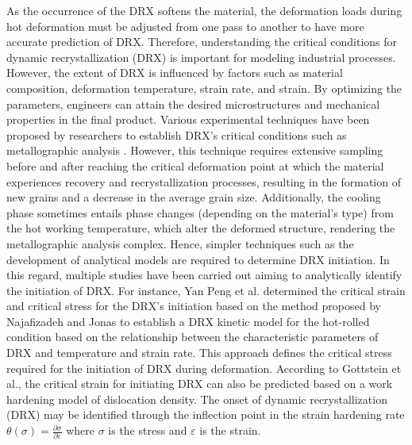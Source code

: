 \documentclass[metals,article,submit,pdftex,moreauthors]{Definitions/mdpi}
\makeatletter
\DeclareRobustCommand{\eal}{et al.\@\xspace}
\makeatother
\begin{document}
As the occurrence of the DRX softens the material, the deformation loads during hot deformation must be adjusted from one pass to another to have more accurate prediction of DRX.
Therefore, understanding the critical conditions for dynamic recrystallization (DRX) is important for modeling industrial processes.
However, the extent of DRX is influenced by factors such as material composition, deformation temperature, strain rate, and strain.
By optimizing the parameters, engineers can attain the desired microstructures and mechanical properties in the final product.
Various experimental techniques have been proposed by researchers to establish DRX's critical conditions such as metallographic analysis \cite{Babu-2022}.
However, this technique requires extensive sampling before and after reaching the critical deformation point at which the material experiences recovery and recrystallization processes, resulting in the formation of new grains and a decrease in the average grain size.
Additionally, the cooling phase sometimes entails phase changes (depending on the material's type) from the hot working temperature, which alter the deformed structure, rendering the metallographic analysis complex.
Hence, simpler techniques such as the development of analytical models are required to determine DRX initiation.
In this regard, multiple studies have been carried out aiming to analytically identify the initiation of DRX.
For instance, Yan Peng \eal \cite{Peng-2022} determined the critical strain and critical stress for the DRX's initiation based on the method proposed by Najafizadeh and Jonas \cite{Najafizadeh-2006} to establish a DRX kinetic model for the hot-rolled condition based on the relationship between the characteristic parameters of DRX and temperature and strain rate. This approach defines the critical stress required for the initiation of DRX during deformation.
According to Gottstein \eal \cite{Gottstein-2004}, the critical strain for initiating DRX can also be predicted based on a work hardening model of dislocation density.
The onset of dynamic recrystallization (DRX) may be identified through the inflection point in the strain hardening rate $\theta(\sigma)=\frac{\partial \sigma}{\partial \varepsilon}$ where $\sigma$ is the stress and $\varepsilon$ is the strain.
\end{document}
